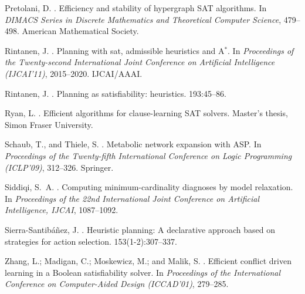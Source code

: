 \begin{thebibliography}{}
Pretolani, D.
.
\newblock Efficiency and stability of hypergraph {SAT} algorithms.
\newblock In {\em DIMACS Series in Discrete
  Mathematics and Theoretical Computer Science},  479--498.
\newblock American Mathematical Society.

Rintanen, J.
.
\newblock Planning with sat, admissible heuristics and {A}$^*$.
\newblock In {\em Proceedings of the Twenty-second
  International Joint Conference on Artificial Intelligence (IJCAI'11)},
  2015--2020.
\newblock IJCAI/AAAI.

Rintanen, J.
.
\newblock Planning as satisfiability: heuristics.
 193:45--86.

Ryan, L.
.
\newblock Efficient algorithms for clause-learning {SAT} solvers.
\newblock Master's thesis, Simon Fraser University.

Schaub, T., and Thiele, S.
.
\newblock Metabolic network expansion with {ASP}.
\newblock In {\em Proceedings of the
  Twenty-fifth International Conference on Logic Programming (ICLP'09)},  312--326.
\newblock Springer.

Siddiqi, S.~A.
.
\newblock Computing minimum-cardinality diagnoses by model relaxation.
\newblock In {\em Proceedings of the 22nd International Joint Conference on
  Artificial Intelligence, IJCAI},  1087--1092.

Sierra-Santib{\'a}{\~n}ez, J.
.
\newblock Heuristic planning: A declarative approach based on strategies for
  action selection.
 153(1-2):307--337.


Zhang, L.; Madigan, C.; Moskewicz, M.; and Malik, S.
.
\newblock Efficient conflict driven learning in a {B}oolean satisfiability
  solver.
\newblock In {\em Proceedings of the International Conference on Computer-Aided
  Design (ICCAD'01)},  279--285.

\end{thebibliography}

